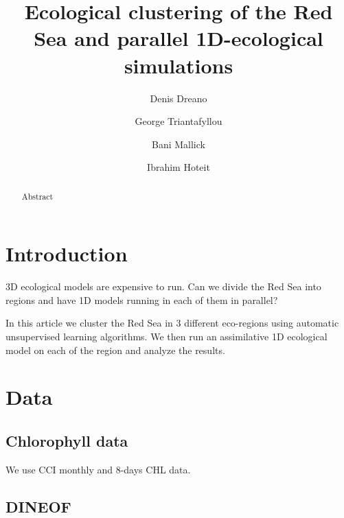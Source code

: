 \documentclass[12pt]{elsarticle}
\begin{document}
\doublespacing

\begin{frontmatter}

  \title{Ecological clustering of the Red Sea and parallel 1D-ecological simulations}

  \author[1]{Denis Dreano}

  \author[3]{George Triantafyllou}

  \author[2]{Bani Mallick}
  
  \author[1]{Ibrahim Hoteit}
   


  \address[1]{Computer, Electrical and Mathematical Sciences and Engineering Division, King Abdullah University of Science and Technology}

  \address[2]{Department of Statistics, Texas A\&M University}

  \address[3]{Hellenic Center for Marine Research}

  \begin{abstract}
  Abstract
  \end{abstract}

\end{frontmatter}

\linenumbers


\section{Introduction}

3D ecological models are expensive to run. Can we divide the Red Sea
into regions and have 1D models running in each of them in parallel?

In this article we cluster the Red Sea in 3 different eco-regions
using automatic unsupervised learning algorithms. We then run an 
assimilative 1D ecological model on each of the region and analyze 
the results.

\section{Data}

\subsection{Chlorophyll data}

We use CCI monthly and 8-days CHL data.

\subsection{DINEOF}
\end{document}
